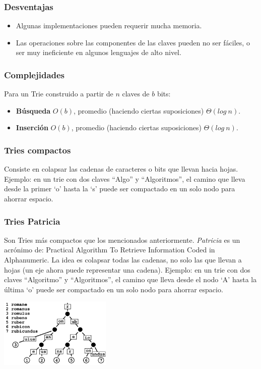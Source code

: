 \subsubsection{Desventajas}
\begin{itemize}
 \item Algunas implementaciones pueden requerir mucha memoria.
 \item Las operaciones sobre las componentes de las claves pueden no ser f\'aciles, o ser muy ineficiente en algunos lenguajes de alto nivel.
\end{itemize}

\subsubsection{Complejidades}

Para un Trie construido a partir de $n$ claves de $b$ bits:

\begin{itemize}
 \item \textbf{B\'usqueda} $O(b)$, promedio (haciendo ciertas suposiciones) $\Theta(log\ n)$.
 \item \textbf{Inserci\'on} $O(b)$, promedio (haciendo ciertas suposiciones) $\Theta(log\ n)$.
\end{itemize}

\subsubsection{Tries compactos}
Consiste en colapsar las cadenas de caracteres o bits que llevan hacia hojas.
Ejemplo: en un trie con dos claves ``Algo'' y ``Algoritmos'', el camino que lleva desde la primer `o' hasta la `s' puede ser compactado en un solo nodo para ahorrar espacio.
\subsubsection{Tries Patricia}
Son Tries m\'as compactos que los mencionados anteriormente. \textit{Patricia} es un acr\'onimo de: Practical Algorithm To Retrieve Information Coded in Alphanumeric.
La idea es colapsar todas las cadenas, no solo las que llevan a hojas (un eje ahora puede representar una cadena). 
Ejemplo: en un trie con dos claves ``Algoritmo'' y ``Algoritmos'', el camino que lleva desde el nodo `A' hasta la \'ultima `o' puede ser compactado en un solo nodo para ahorrar espacio.

\begin{center}
 \includegraphics[width=0.4\textwidth, height=0.3\textwidth]{./graficos/trie-patricia.png}
\end{center}

